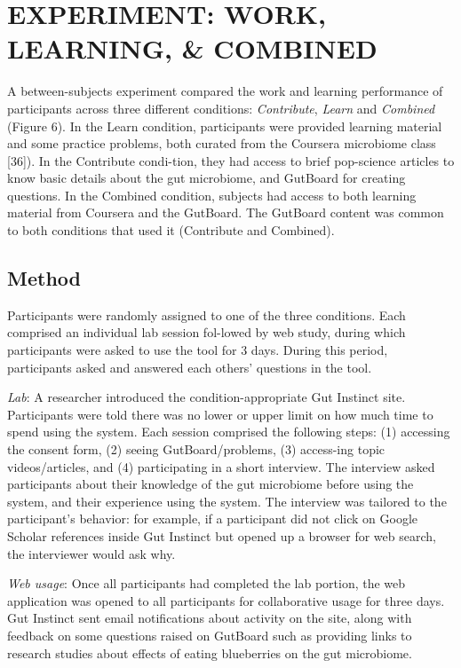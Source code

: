 \section{EXPERIMENT: WORK, LEARNING, \& COMBINED }
A between-subjects experiment compared the work and learning performance of participants across three different conditions: \textit{Contribute}, \textit{Learn} and \textit{Combined} (Figure 6). In the Learn condition, participants were provided learning material and some practice problems, both curated from the Coursera microbiome class [36]). In the Contribute condi-tion, they had access to brief pop-science articles to know basic details about the gut microbiome, and GutBoard for creating questions. In the Combined condition, subjects had access to both learning material from Coursera and the GutBoard. The GutBoard content was common to both conditions that used it (Contribute and Combined).

\subsection{Method}
Participants were randomly assigned to one of the three conditions. Each comprised an individual lab session fol-lowed by web study, during which participants were asked to use the tool for 3 days. During this period, participants asked and answered each others’ questions in the tool.

\textit{Lab}: A researcher introduced the condition-appropriate Gut Instinct site. Participants were told there was no lower or upper limit on how much time to spend using the system. Each session comprised the following steps: (1) accessing the consent form, (2) seeing GutBoard/problems, (3) access-ing topic videos/articles, and (4) participating in a short interview. The interview asked participants about their knowledge of the gut microbiome before using the system, and their experience using the system. The interview was tailored to the participant’s behavior: for example, if a participant did not click on Google Scholar references inside Gut Instinct but opened up a browser for web search, the interviewer would ask why.
 
\textit{Web usage}: Once all participants had completed the lab portion, the web application was opened to all participants for collaborative usage for three days. Gut Instinct sent email notifications about activity on the site, along with feedback on some questions raised on GutBoard such as providing links to research studies about effects of eating blueberries on the gut microbiome. 

